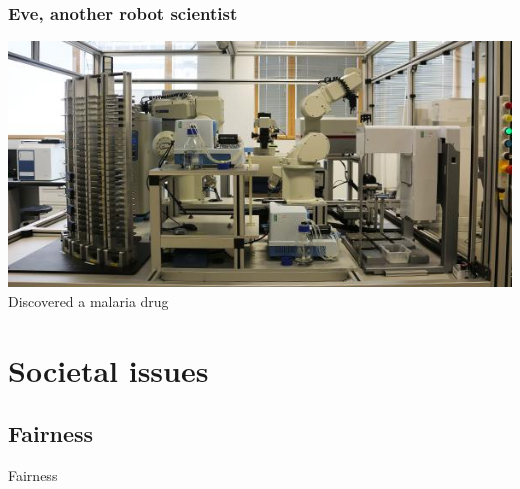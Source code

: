 \documentclass{beamer}
\begin{document}
\begin{frame}
  \frametitle{Eve, another robot scientist}
  \includegraphics[width=\textwidth]{figures/eve.jpg}
  Discovered a malaria drug
\end{frame}

\section{Societal issues}


\subsection{Fairness}



\begin{frame}
  \begin{center} 
    {\Huge Fairness}
  \end{center}
\end{frame}
\end{document}
